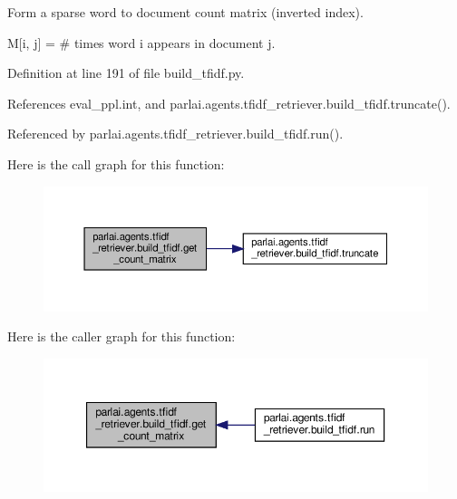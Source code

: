 \begin{DoxyVerb}Form a sparse word to document count matrix (inverted index).

M[i, j] = # times word i appears in document j.
\end{DoxyVerb}
 

Definition at line 191 of file build\+\_\+tfidf.\+py.



References eval\+\_\+ppl.\+int, and parlai.\+agents.\+tfidf\+\_\+retriever.\+build\+\_\+tfidf.\+truncate().



Referenced by parlai.\+agents.\+tfidf\+\_\+retriever.\+build\+\_\+tfidf.\+run().

Here is the call graph for this function\+:
\nopagebreak
\begin{figure}[H]
\begin{center}
\leavevmode
\includegraphics[width=350pt]{namespaceparlai_1_1agents_1_1tfidf__retriever_1_1build__tfidf_a0d95180be94e232e3ebc748c8aa7b9a0_cgraph}
\end{center}
\end{figure}
Here is the caller graph for this function\+:
\nopagebreak
\begin{figure}[H]
\begin{center}
\leavevmode
\includegraphics[width=350pt]{namespaceparlai_1_1agents_1_1tfidf__retriever_1_1build__tfidf_a0d95180be94e232e3ebc748c8aa7b9a0_icgraph}
\end{center}
\end{figure}
\mbox{\label{namespaceparlai_1_1agents_1_1tfidf__retriever_1_1build__tfidf_ac277ce99c037a483df09e82cfdbe4665}} 
